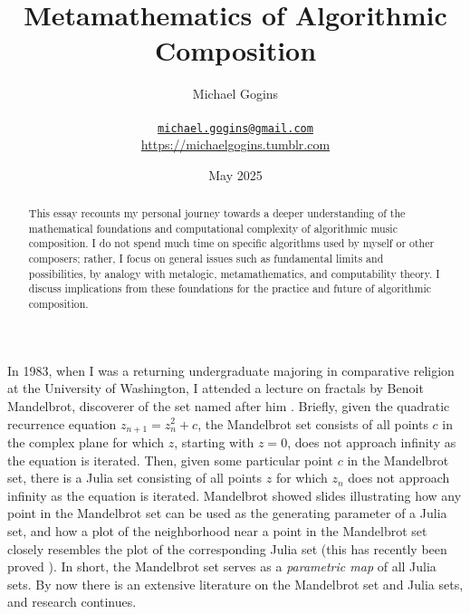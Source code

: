 \documentclass[11pt]{scrartcl}
\begin{document}
\title{Metamathematics of Algorithmic Composition}
\author{Michael Gogins \\ \\ \texttt{\href{mailto:michael.gogins@gmail.com}{michael.gogins@gmail.com}}  \\ \url{https://michaelgogins.tumblr.com}}
\date{ May 2025}                                           %

\maketitle
\begin{abstract}
This essay recounts my personal journey towards a deeper understanding of the mathematical foundations and computational complexity of algorithmic music composition. I do not spend much time on specific algorithms used by myself or other composers; rather, I focus on general issues such as fundamental limits and possibilities, by analogy with metalogic, metamathematics, and computability theory. I discuss  implications from these foundations for the practice and future of algorithmic composition. 
\end{abstract}

In 1983, when I was a returning undergraduate majoring in comparative religion at the University of Washington, I attended a lecture on fractals by Benoit Mandelbrot, discoverer of the set named after him \parencite{citeulike:580392, peitgen2004mandelbrot}. Briefly, given the quadratic recurrence equation $z_{n+1} = z_n^2 + c$, the Mandelbrot set consists of all points $c$ in the complex plane for which $z$, starting with $z = 0$, does not approach infinity as the equation is iterated. Then, given some particular point $c$ in the Mandelbrot set, there is a Julia set consisting of all points $z$ for which $z_n$ does not approach infinity as the equation is iterated.  Mandelbrot showed slides illustrating how any point in the Mandelbrot set can be used as the generating parameter of a Julia set, and how a plot of the neighborhood near a point in the Mandelbrot set closely resembles the plot of the corresponding Julia set \parencite{lei1990similarity} (this has recently been proved \parencite{kawahira2018julia}). In short, the Mandelbrot set serves as a \emph{parametric map} of all Julia sets. By now there is an extensive literature on the Mandelbrot set and Julia sets, and research continues. 
\end{document}
